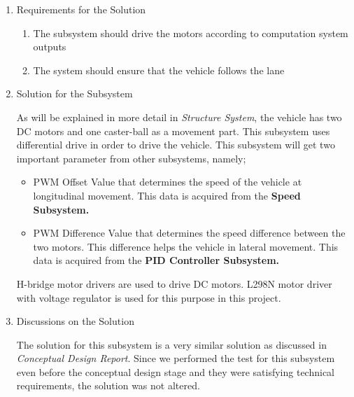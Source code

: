 \documentclass[a4paper,12pt]{article}
\begin{document}
\begin{enumerate}

\item {Requirements for the Solution}


\begin{enumerate}

\item The subsystem should drive the motors according to computation system outputs

\item The system should ensure that the vehicle follows the lane 	

\end{enumerate}


\item {Solution for the Subsystem}


As will be explained in more detail in \textit{Structure System}, the vehicle has two DC motors and one caster-ball as a movement part. This subsystem uses differential drive in order to drive the vehicle. This subsystem will get two important parameter from other subsystems, namely;


\begin{itemize}

\item PWM Offset Value that determines the speed of the vehicle at longitudinal movement. This data is acquired from the \textbf{Speed Subsystem.} 	

\item PWM Difference Value that determines the speed difference between the two motors. This difference helps the vehicle in lateral movement. This data is acquired from the \textbf{PID Controller Subsystem.} 	

\end{itemize}	


H-bridge motor drivers are used to drive DC motors. L298N motor driver with voltage regulator is used for this purpose in this project. 


\item {Discussions on the Solution}


The solution for this subsystem is a very similar solution as discussed in \textit{Conceptual Design Report}. Since we performed the test for this subsystem even before the conceptual design stage and they were satisfying technical requirements, the solution was not altered. 



\end{enumerate}
\end{document}
